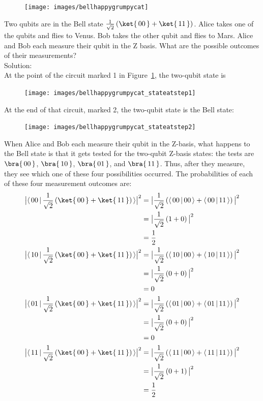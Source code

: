 \documentclass{article}
\newcommand{\soln}{{\\[1em] \hspace{-1em}\color{greentitle}\sffamily\large Solution: \\[0.5em]}}
\theoremstyle{definition}
\newcommand{\abs}[1]{{\big\vert} #1 {\big\vert}}
\newcommand{\kz}[1]{\ket{\,#1\,}}
\newcommand{\bz}[1]{\bra{\,#1\,}}
\begin{document}
\begin{figure}[H]
	\label{fig:bellhappygrumpycat}
	\texttt{[image: images/bellhappygrumpycat]}
\end{figure}
\newpage
\begin{example} \label{ex:bellmeaszz}
	Two qubits are in the Bell state $\frac{1}{\sqrt{2}} \left(\kz{00} + \kz{11}\right)$.  Alice takes one of the qubits and flies to Venus.  Bob takes the other qubit and flies to Mars.  Alice and Bob each measure their qubit in the Z basis.  What are the possible outcomes of their measurements?
	\soln \textnormal{At the point of the circuit marked 1 in Figure~\ref{fig:bellhappygrumpycat}, the two-qubit state is}
	\begin{figure}[H]
		\texttt{[image: images/bellhappygrumpycat\_stateatstep1]}
	\end{figure}
	\textnormal{At the end of that circuit, marked 2, the two-qubit state is the Bell state:}
	\begin{figure}[H]
		\texttt{[image: images/bellhappygrumpycat\_stateatstep2]}
	\end{figure}
	\textnormal{When Alice and Bob each measure their qubit in the Z-basis, what happens to the Bell state is that it gets tested for the two-qubit Z-basis states: the tests are $\bz{00}$, $\bz{10}$, $\bz{01}$, and $\bz{11}$.  Thus, after they measure, they see which one of these four possibilities occurred.  The probabilities of each of these four measurement outcomes are:}
	\begin{align}
		\abs{\langle \,00\,|\,\frac{1}{\sqrt{2}} \left(\kz{00} + \kz{11}\right)\,\rangle}^2 &= \abs{\frac{1}{\sqrt{2}}\left( \langle \,00\,|\,00\,\rangle + \langle \,00\,|\,11\,\rangle \right)}^2\\
		&= \abs{\frac{1}{\sqrt{2}}\left( 1 + 0 \right)}^2\\
		&= \frac{1}{2}\\
		\abs{\langle \,10\,|\,\frac{1}{\sqrt{2}} \left(\kz{00} + \kz{11}\right)\,\rangle}^2 &= \abs{\frac{1}{\sqrt{2}}\left( \langle \,10\,|\,00\,\rangle + \langle \,10\,|\,11\,\rangle \right)}^2\\
		&= \abs{\frac{1}{\sqrt{2}}\left( 0 + 0 \right)}^2\\
		&= 0\\
		\abs{\langle \,01\,|\,\frac{1}{\sqrt{2}} \left(\kz{00} + \kz{11}\right)\,\rangle}^2 &= \abs{\frac{1}{\sqrt{2}}\left( \langle \,01\,|\,00\,\rangle + \langle \,01\,|\,11\,\rangle \right)}^2\\
		&= \abs{\frac{1}{\sqrt{2}}\left( 0 + 0 \right)}^2\\
		&= 0\\
		\abs{\langle \,11\,|\,\frac{1}{\sqrt{2}} \left(\kz{00} + \kz{11}\right)\,\rangle}^2 &= \abs{\frac{1}{\sqrt{2}}\left( \langle \,11\,|\,00\,\rangle + \langle \,11\,|\,11\,\rangle \right)}^2\\
		&= \abs{\frac{1}{\sqrt{2}}\left( 0 + 1 \right)}^2\\
		&= \frac{1}{2}
	\end{align}
\end{example}
\end{document}
